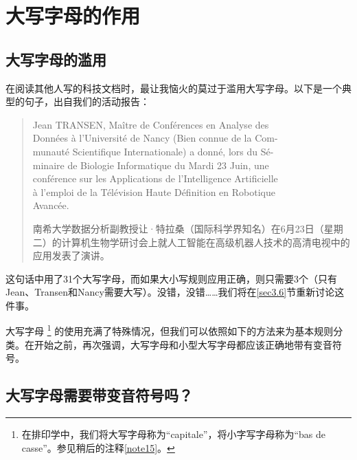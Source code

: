 \chapter{大写字母的作用}

\section{大写字母的滥用}

在阅读其他人写的科技文档时，最让我恼火的莫过于滥用大写字母。以下是一个典型的句子，出自我们的活动报告：

\begin{quote}
    Jean TRANSEN, Maître de Conférences en Analyse des \\
    Données à l'Université de Nancy (Bien connue de la Com-\\
    munauté Scientifique Internationale) a donné, lors du Sé-\\
    minaire de Biologie Informatique du Mardi 23 Juin, une \\
    conférence sur les Applications de l'Intelligence Artificielle \\
    à l'emploi de la Télévision Haute Définition en Robotique \\
    Avancée.

    \begin{bil}
        南希大学数据分析副教授让·特拉桑（国际科学界知名）在6月23日（星期二）的计算机生物学研讨会上就人工智能在高级机器人技术的高清电视中的应用发表了演讲。
    \end{bil}
\end{quote}
    
这句话中用了31个大写字母，而如果大小写规则应用正确，则只需要3个（只有Jean、Transen和Nancy需要大写）。没错，没错……我们将在\ref{sec3.6}节重新讨论这件事。

大写字母
    \footnote{在排印学中，我们将大写字母称为``capitale''，将小字写字母称为``bas de casse''。参见稍后的注释\ref{note15}。}
的使用充满了特殊情况，但我们可以依照如下的方法来为基本规则分类。在开始之前，再次强调，大写字母和小型大写字母都应该正确地带有变音符号。

\section{大写字母需要带变音符号吗？}

